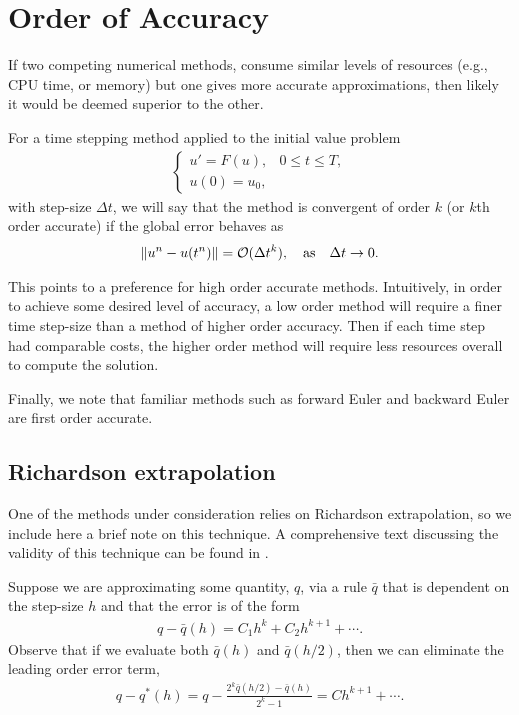 \section{Order of Accuracy}
If two competing numerical methods, consume similar levels of resources (e.g., CPU time, or memory) but one gives more accurate approximations, then likely it would be deemed superior to the other. 

For a time stepping method applied to the initial value problem 
\begin{align}
\begin{cases}
        u' = F(u), & 0\leq t \leq T, \\
 u(0) = u_0, 
\end{cases}
\end{align}
with step-size $\Delta t$, 
we will say that the method is convergent of order $k$ (or $k$th order accurate) if the global error behaves as 
\begin{align}
        \left\lVert u^{n} - u(t^n)\right\rVert = \mathcal{O}(\Delta t^k),
\quad\text{as}\quad \Delta t \to 0.
\end{align}

This points to a preference for high order accurate methods. Intuitively, in order to achieve some desired level of accuracy, a low order method will require a finer time step-size than a method of higher order accuracy. Then if each time step had comparable costs, the higher order method will require less resources overall to compute the solution. 

Finally, we note that familiar methods such as forward Euler and backward Euler are first order accurate.

\subsection{Richardson extrapolation}
One of the methods under consideration relies on Richardson extrapolation, so we include here a brief note on this technique. A comprehensive text discussing the validity of this technique can be found in \cite{sidi2003practical}.

Suppose we are approximating some quantity, $q$, via a rule $\bar q$ that is dependent on the step-size $h$ and that the error is of the form 
\begin{align}
        q - \bar q(h) = C_1 h^k  + C_2 h^{k+1} + \cdots.
\end{align}
Observe that if we evaluate both $\bar q(h)$ and $\bar q(h/2)$, then we can eliminate the leading order error term,
\begin{align}
        q-q^*(h) = q-\frac{2^k \bar q(h/2)  -\bar q(h)}{2^k-1} 
= Ch^{k+1} + \cdots .
\end{align}

